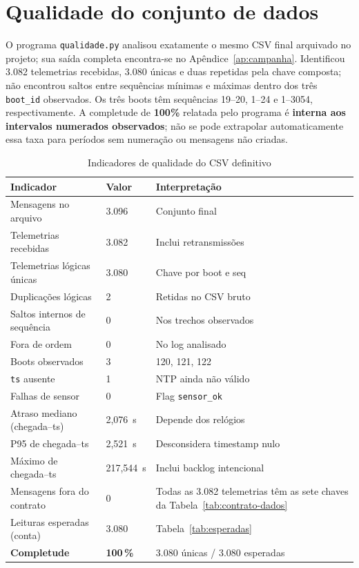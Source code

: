 \section{Qualidade do conjunto de dados}\label{sec:qualidade}
O programa \texttt{qualidade.py} analisou exatamente o mesmo CSV final arquivado no projeto; sua saída completa encontra-se no Apêndice~\ref{ap:campanha}. Identificou 3.082 telemetrias recebidas, 3.080 únicas e duas repetidas pela chave composta; não encontrou saltos entre sequências mínimas e máximas dentro dos três \texttt{boot\_id} observados. Os três boots têm sequências 19--20, 1--24 e 1--3054, respectivamente. A completude de \textbf{100\%} relatada pelo programa é \textbf{interna aos intervalos numerados observados}; não se pode extrapolar automaticamente essa taxa para períodos sem numeração ou mensagens não criadas.
\begin{table}[H]\centering\caption{Indicadores de qualidade do CSV definitivo}\label{tab:qualidade}\footnotesize
\begin{tabular}{@{}L{7cm}R{3.2cm}L{3.1cm}@{}}\toprule
Indicador&Valor&Interpretação\\\midrule
Mensagens no arquivo&3.096&Conjunto final\\
Telemetrias recebidas&3.082&Inclui retransmissões\\
Telemetrias lógicas únicas&3.080&Chave por boot e seq\\
Duplicações lógicas&2&Retidas no CSV bruto\\
Saltos internos de sequência&0&Nos trechos observados\\
Fora de ordem&0&No log analisado\\
Boots observados&3&120, 121, 122\\
\texttt{ts} ausente&1&NTP ainda não válido\\
Falhas de sensor&0&Flag \texttt{sensor\_ok}\\
Atraso mediano (chegada--ts)&2,076~s&Depende dos relógios\\
P95 de chegada--ts&2,521~s&Desconsidera timestamp nulo\\
Máximo de chegada--ts&217,544~s&Inclui backlog intencional\\
Mensagens fora do contrato&0&Todas as 3.082 telemetrias têm as sete chaves da Tabela~\ref{tab:contrato-dados}\\\midrule
Leituras esperadas (conta)&3.080&Tabela~\ref{tab:esperadas}\\
\textbf{Completude}&\textbf{100\,\%}&3.080 únicas / 3.080 esperadas\\\bottomrule\end{tabular}\end{table}
